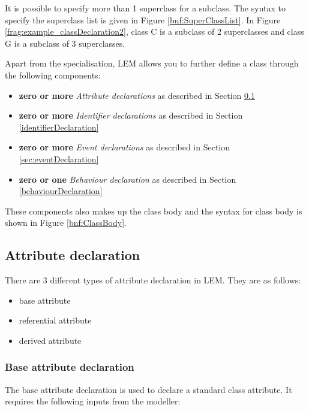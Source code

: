 
It is possible to specify more than 1 superclass for a subclass. The syntax to specify the superclass list is given in Figure \ref{bnf:SuperClassList}. In Figure \ref{frag:example_classDeclaration2}, class C is a subclass of 2 superclasses and class G is a subclass of 3 superclasses.

Apart from the specialisation, LEM allows you to further define a class through the following components:

\begin{itemize}
\item \textbf{zero or more} \textit{Attribute declarations} as described in Section \ref{attributeDeclaration}
\item \textbf{zero or more} \textit{Identifier declarations} as described in Section \ref{identifierDeclaration}
\item \textbf{zero or more} \textit{Event declarations} as described in Section \ref{sec:eventDeclaration}
\item \textbf{zero or one} \textit{Behaviour declaration} as described in Section \ref{behaviourDeclaration}
\end{itemize}

These components also makes up the class body and the syntax for class body is shown in Figure \ref{bnf:ClassBody}.


\subsection{Attribute declaration}\label{attributeDeclaration}
There are 3 different types of attribute declaration in LEM. They are as follows:

\begin{itemize}
\item base attribute
\item referential attribute
\item derived attribute
\end{itemize}

\subsubsection{Base attribute declaration}
The base attribute declaration is used to declare a standard class attribute. It requires the following inputs from the modeller:

